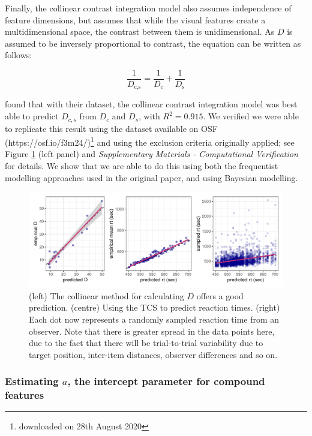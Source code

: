 \documentclass[preprint,12pt,authoryear]{elsarticle}
\begin{document}
Finally, the collinear contrast integration model also assumes independence of feature dimensions, but assumes that while the visual features create a multidimensional space, the contrast between them is unidimensional. As $D$ is assumed to be inversely proportional to contrast, the equation can be written as follows:

\begin{equation}
\frac{1}{D_\text{c,s}} = \frac{1}{D_\text{c}} + \frac{1}{D_\text{s}}
\label{eq:collinearcontrast}
\end{equation}

\cite{buetti2019predicting} found that with their dataset, the collinear contrast integration model was best able to predict $D_{c,s}$ from $D_c$ and $D_s$, with $R^2 = 0.915$. We verified we were able to replicate this result using the dataset available on OSF (https://osf.io/f3m24/)\footnote{downloaded on 28th August 2020} and using the exclusion criteria originally applied; see Figure \ref{fig:comp_rep} (left panel) and \textit{Supplementary Materials - Computational Verification} for details. We show that we are able to do this using both the frequentist modelling approaches used in the original paper, and using Bayesian modelling.

\begin{figure}
\centering
\includegraphics[width=\textwidth]{../plots/computational_replication.pdf}
\caption{(left) The collinear method for calculating $D$ offers a good prediction. (centre) Using the TCS to predict reaction times. (right) Each dot now represents a randomly sampled reaction time from an observer. Note that there is greater spread in the data points here, due to the fact that there will be trial-to-trial variability due to target position, inter-item distances, observer differences and so on.}
\label{fig:comp_rep}
\end{figure}

\subsubsection{Estimating $a$, the intercept parameter for compound features}
\end{document}
